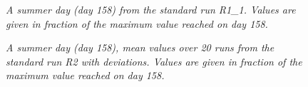 		\begin{figure}[H]
			\centering
			\caption{\textit{A summer day (day 158) from the standard run R1\_1. Values are given in fraction of the maximum value reached on day 158.}}
			\label{fig:day158}
		\end{figure}
		
		\begin{figure}[H]
			\centering
			\caption{\textit{A summer day (day 158), mean values over 20 runs from the standard run R2 with deviations. Values are given in fraction of the maximum value reached on day 158.}}
			\label{fig:day158variation}
		\end{figure}
	
